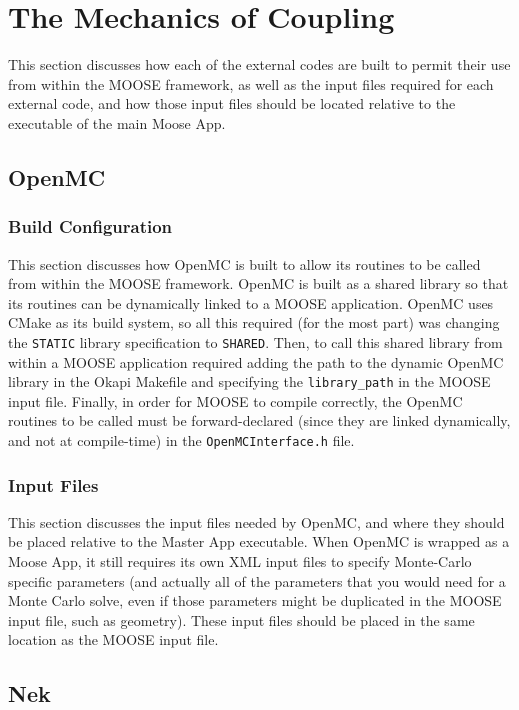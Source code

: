 \documentclass[10pt]{article}
\numberwithin{equation}{section} %
\begin{document}
\clearpage
\section{The Mechanics of Coupling}
This section discusses how each of the external codes are built to permit their use from within the MOOSE framework, as well as the input files required for each external code, and how those input files should be located relative to the executable of the main Moose App.

\subsection{OpenMC}

\subsubsection{Build Configuration}
This section discusses how OpenMC is built to allow its routines to be called from within the MOOSE framework. OpenMC is built as a shared library so that its routines can be dynamically linked to a MOOSE application. OpenMC uses CMake as its build system, so all this required (for the most part) was changing the {\tt STATIC} library specification to {\tt SHARED}. Then, to call this shared library from within a MOOSE application required adding the path to the dynamic OpenMC library in the Okapi Makefile and specifying the {\tt library\_path} in the MOOSE input file. Finally, in order for MOOSE to compile correctly, the OpenMC routines to be called must be forward-declared (since they are linked dynamically, and not at compile-time) in the {\tt OpenMCInterface.h} file.

\subsubsection{Input Files}
This section discusses the input files needed by OpenMC, and where they should be placed relative to the Master App executable. When OpenMC is wrapped as a Moose App, it still requires its own XML input files to specify Monte-Carlo specific parameters (and actually all of the parameters that you would need for a Monte Carlo solve, even if those parameters might be duplicated in the MOOSE input file, such as geometry). These input files should be placed in the same location as the MOOSE input file.

\subsection{Nek}
\end{document}

